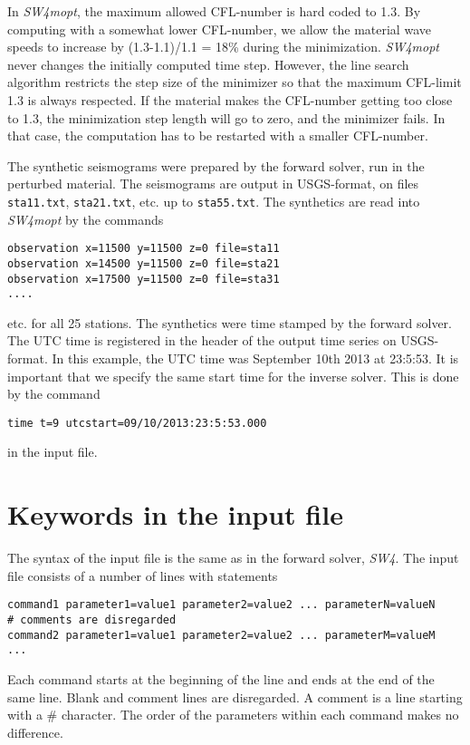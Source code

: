 \documentclass[12pt]{report}
\begin{document}
In \emph{SW4mopt}, the maximum allowed CFL-number is hard coded to 1.3. By computing with a somewhat lower 
CFL-number, we allow the material wave speeds to increase by (1.3-1.1)/1.1 = 18\% during the minimization. 
\emph{SW4mopt} never changes the initially computed time step. However, the line search algorithm restricts
the step size of the minimizer so that the maximum CFL-limit 1.3 is always respected. 
If the material makes the CFL-number getting too close to 1.3, the minimization step length will go 
to zero, and the minimizer fails. In that case, the computation has to be restarted with a 
smaller CFL-number. 
\par
The synthetic seismograms were prepared by the forward solver, run in the perturbed material. The
seismograms are output in USGS-format, on files \verb+sta11.txt+, \verb+sta21.txt+, etc. up
to \verb+sta55.txt+. The synthetics are read into \emph{SW4mopt} by the commands
\begin{verbatim}
observation x=11500 y=11500 z=0 file=sta11
observation x=14500 y=11500 z=0 file=sta21
observation x=17500 y=11500 z=0 file=sta31
....
\end{verbatim}
etc. for all 25 stations. The synthetics were time stamped by the forward solver. The UTC time is
registered in the header of the output time series on USGS-format. In this example, the UTC time
was September 10th 2013 at 23:5:53. It is important that we specify the same start time for the 
inverse solver. This is done by the command
\begin{verbatim}
time t=9 utcstart=09/10/2013:23:5:53.000
\end{verbatim}
in the input file.

\chapter{Keywords in the input file}\label{chap:keywords}
The syntax of the input file is the same as in the forward solver, \emph{SW4}. The input
file consists of a number of lines with statements
\begin{verbatim}
command1 parameter1=value1 parameter2=value2 ... parameterN=valueN
# comments are disregarded
command2 parameter1=value1 parameter2=value2 ... parameterM=valueM
...
\end{verbatim}
Each command starts at the beginning of the line and ends at the end of the same line. Blank and
comment lines are disregarded. A comment is a line starting with a \# character. The order of the
parameters within each command makes no difference. 
\end{document}
